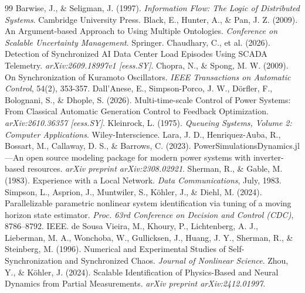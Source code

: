 \documentclass[11pt,fleqn]{article}
\begin{document}
\begin{thebibliography}{99}
 Barwise, J., \& Seligman, J. (1997). \textit{Information Flow: The Logic of Distributed Systems}. Cambridge University Press.
 Black, E., Hunter, A., \& Pan, J. Z. (2009). An Argument-based Approach to Using Multiple Ontologies. \textit{Conference on Scalable Uncertainty Management}. Springer.
 Chaudhary, C., et al. (2026). Detection of Synchronized AI Data Center Load Episodes Using SCADA Telemetry. \textit{arXiv:2609.18997v1 [eess.SY]}.
 Chopra, N., \& Spong, M. W. (2009). On Synchronization of Kuramoto Oscillators. \textit{IEEE Transactions on Automatic Control}, 54(2), 353-357.
 Dall'Anese, E., Simpson-Porco, J. W., Dörfler, F., Bolognani, S., \& Dhople, S. (2026). Multi-time-scale Control of Power Systems: From Classical Automatic Generation Control to Feedback Optimization. \textit{arXiv:2610.36357 [eess.SY]}.
 Kleinrock, L. (1975). \textit{Queueing Systems, Volume 2: Computer Applications}. Wiley-Interscience.
 Lara, J. D., Henriquez-Auba, R., Bossart, M., Callaway, D. S., \& Barrows, C. (2023). PowerSimulationsDynamics.jl---An open source modeling package for modern power systems with inverter-based resources. \textit{arXiv preprint arXiv:2308.02921}.
 Sherman, R., \& Gable, M. (1983). Experience with a Local Network. \textit{Data Communications}, July, 1983.
 Simpson, L., Asprion, J., Muntwiler, S., Köhler, J., \& Diehl, M. (2024). Parallelizable parametric nonlinear system identification via tuning of a moving horizon state estimator. \textit{Proc. 63rd Conference on Decision and Control (CDC)}, 8786–8792. IEEE.
 de Sousa Vieira, M., Khoury, P., Lichtenberg, A. J., Lieberman, M. A., Wonchoba, W., Gullicksen, J., Huang, J. Y., Sherman, R., \& Steinberg, M. (1996). Numerical and Experimental Studies of Self-Synchronization and Synchronized Chaos. \textit{Journal of Nonlinear Science}.
 Zhou, Y., \& Köhler, J. (2024). Scalable Identification of Physics-Based and Neural Dynamics from Partial Measurements. \textit{arXiv preprint arXiv:2412.01997}.
\end{thebibliography}
\end{document}
